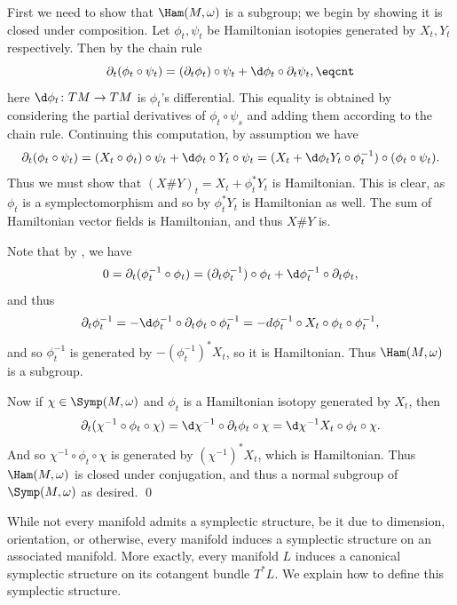 \eprop

\bproof

    First we need to show that $\Ham(M,\omega)$ is a subgroup; we begin by showing it is closed under composition.
    Let $\phi_t,\psi_t$ be Hamiltonian isotopies generated by $X_t,Y_t$ respectively.
    Then by the chain rule
    $$ \partial_t(\phi_t\circ\psi_t) = (\partial_t\phi_t)\circ\psi_t + \d\phi_t\circ\partial_t\psi_t , \eqcnt $$
    here $\d\phi_t\colon TM\to TM$ is $\phi_t$'s differential.
    This equality is obtained by considering the partial derivatives of $\phi_t\circ\psi_s$ and adding them according to the chain rule.
    Continuing this computation, by assumption we have
    $$ \partial_t(\phi_t\circ\psi_t) = (X_t\circ\phi_t)\circ\psi_t + \d\phi_t\circ Y_t\circ\psi_t = (X_t + \d\phi_t Y_t\circ\phi_t^{-1})\circ(\phi_t\circ\psi_t) . $$
    Thus we must show that $(X\#Y)_t=X_t+\phi_t^*Y_t$ is Hamiltonian.
    This is clear, as $\phi_t$ is a symplectomorphism and so by  $\phi_t^*Y_t$ is Hamiltonian as well.
    The sum of Hamiltonian vector fields is Hamiltonian, and thus $X\#Y$ is.

    Note that by \gotoleqn{}, we have
    $$ 0 = \partial_t(\phi_t^{-1}\circ\phi_t) = (\partial_t\phi_t^{-1})\circ\phi_t + \d\phi_t^{-1}\circ\partial_t\phi_t , $$
    and thus
    $$ \partial_t\phi_t^{-1} = -\d\phi_t^{-1}\circ\partial_t\phi_t\circ\phi_t^{-1} = -d\phi_t^{-1}\circ X_t\circ\phi_t\circ\phi_t^{-1} , $$
    and so $\phi_t^{-1}$ is generated by $-(\phi_t^{-1})^*X_t$, so it is Hamiltonian.
    Thus $\Ham(M,\omega)$ is a subgroup.

    Now if $\chi\in\Symp(M,\omega)$ and $\phi_t$ is a Hamiltonian isotopy generated by $X_t$, then
    $$ \partial_t(\chi^{-1}\circ\phi_t\circ\chi) = \d\chi^{-1}\circ\partial_t\phi_t\circ\chi = \d\chi^{-1}X_t\circ\phi_t\circ\chi . $$
    And so $\chi^{-1}\circ\phi_t\circ\chi$ is generated by $(\chi^{-1})^*X_t$, which is Hamiltonian.
    Thus $\Ham(M,\omega)$ is closed under conjugation, and thus a normal subgroup of $\Symp(M,\omega)$ as desired.
    \qed

\eproof

\bremark[name={cotangentsymp}]

    While not every manifold admits a symplectic structure, be it due to dimension, orientation, or otherwise, every manifold induces a symplectic structure
    on an associated manifold.
    More exactly, every manifold $L$ induces a canonical symplectic structure on its cotangent bundle $T^*L$.
    We explain how to define this symplectic structure.

